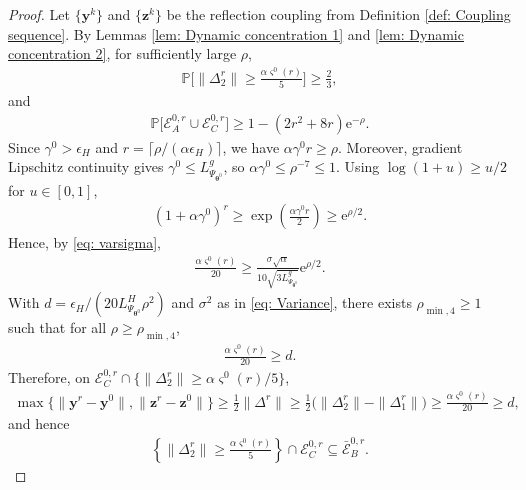 \documentclass{siamart251216}
\begin{document}
\begin{proof}
    Let $\{\mathbf{y}^{k}\}$ and $\{\mathbf{z}^{k}\}$ be the reflection coupling from Definition \ref{def: Coupling sequence}. By Lemmas \ref{lem: Dynamic concentration 1} and \ref{lem: Dynamic concentration 2}, for sufficiently large $\rho$,
    \begin{gather}
        \label{eq: Delta two}
        \mathbb{P}\Big[\|\Delta_{2}^{r}\|\geq\frac{\alpha\varsigma^{0}(r)}{5}\Big]\geq\frac{2}{3},
    \end{gather}
    and
    \begin{gather}
        \label{eq: Delta one}
        \mathbb{P}\Big[\mathcal{E}_{A}^{0,r}\cup\mathcal{E}_{C}^{0,r}\Big]
        \geq1-(2r^{2}+8r)\mathrm{e}^{-\rho}.
    \end{gather}
    Since $\gamma^{0}>\epsilon_H$ and $r=\lceil\rho/(\alpha\epsilon_H)\rceil$, we have $\alpha\gamma^{0}r\geq\rho$. Moreover, gradient Lipschitz continuity gives $\gamma^{0}\leq L_{\Psi_{\boldsymbol{\theta}^{0}}}^{g}$, so $\alpha\gamma^{0}\leq\rho^{-7}\leq1$. Using $\log(1+u)\geq u/2$ for $u\in[0,1]$,
    \begin{gather*}
        (1+\alpha\gamma^{0})^{r}
        \geq\exp\!\left(\frac{\alpha\gamma^{0}r}{2}\right)
        \geq\mathrm{e}^{\rho/2}.
    \end{gather*}
    Hence, by \eqref{eq: varsigma},
    \begin{gather*}
        \frac{\alpha\varsigma^{0}(r)}{20}
        \geq
        \frac{\sigma\sqrt{\alpha}}{10\sqrt{3L_{\Psi_{\boldsymbol{\theta}^{0}}}^{g}}}\mathrm{e}^{\rho/2}.
    \end{gather*}
    With $d=\epsilon_H/(20L_{\Psi_{\boldsymbol{\theta}^{0}}}^{H}\rho^{2})$ and $\sigma^{2}$ as in \eqref{eq: Variance}, there exists $\rho_{\min,4}\geq1$ such that for all $\rho\geq\rho_{\min,4}$,
    \begin{gather}
        \label{eq: varsigma lower bound}
        \frac{\alpha\varsigma^{0}(r)}{20}\geq d.
    \end{gather}
    Therefore, on $\mathcal{E}_{C}^{0,r}\cap\{\|\Delta_{2}^{r}\|\geq\alpha\varsigma^{0}(r)/5\}$,
    \begin{gather*}
        \max\{\|\mathbf{y}^{r}-\mathbf{y}^{0}\|,\|\mathbf{z}^{r}-\mathbf{z}^{0}\|\}
        \geq\frac12\|\Delta^{r}\|
        \geq\frac12\big(\|\Delta_{2}^{r}\|-\|\Delta_{1}^{r}\|\big)
        \geq\frac{\alpha\varsigma^{0}(r)}{20}
        \geq d,
    \end{gather*}
    and hence
    \begin{gather}
        \label{eq: Delta 2 and C to B}
        \left\{\|\Delta_{2}^{r}\|\geq\frac{\alpha\varsigma^{0}(r)}{5}\right\}
        \cap\mathcal{E}_{C}^{0,r}
        \subseteq\bar{\mathcal{E}}_{B}^{0,r}.
    \end{gather}


\end{proof}
\end{document}
